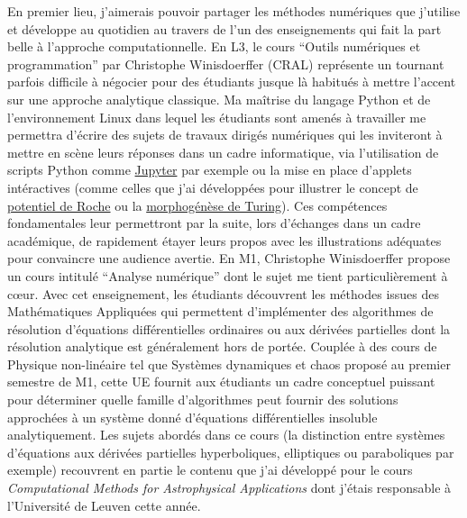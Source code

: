 \documentclass[11pt,onecolumn]{article}
\begin{document}
En premier lieu, j’aimerais pouvoir partager les méthodes numériques que j’utilise et développe au quotidien au travers de l’un des enseignements qui fait la part belle à l’approche computationnelle. En L3, le cours “Outils numériques et programmation” par Christophe Winisdoerffer (CRAL) représente un tournant parfois difficile à négocier pour des étudiants jusque là habitués à mettre l’accent sur une approche analytique classique. Ma maîtrise du langage Python et de l’environnement Linux dans lequel les étudiants sont amenés à travailler me permettra d’écrire des sujets de travaux dirigés numériques qui les inviteront à mettre en scène leurs réponses dans un cadre informatique, via l’utilisation de scripts Python comme \href{https://jupyter.org/}{Jupyter} par exemple ou la mise en place d’applets intéractives (comme celles que j’ai développées pour illustrer le concept de \href{http://demonstrations.wolfram.com/TrajectoryOfATestMassInARochePotential/}{potentiel de Roche} ou la \href{https://media4.obspm.fr/public/M2R/appliquettes/Turing/AutomateTuring_website.html}{morphogénèse de Turing}). 
Ces compétences fondamentales leur permettront par la suite, lors d’échanges dans un cadre académique, de rapidement étayer leurs propos avec les illustrations adéquates pour convaincre une audience avertie. En M1, Christophe Winisdoerffer propose un cours intitulé “Analyse numérique” dont le sujet me tient particulièrement à c\oe{}ur. Avec cet enseignement, les étudiants découvrent les méthodes issues des Mathématiques Appliquées qui permettent d’implémenter des algorithmes de résolution d’équations différentielles ordinaires ou aux dérivées partielles dont la résolution analytique est généralement hors de portée. Couplée à des cours de Physique non-linéaire tel que Systèmes dynamiques et chaos proposé au premier semestre de M1, cette UE fournit aux étudiants un cadre conceptuel puissant pour déterminer quelle famille d’algorithmes peut fournir des solutions approchées à un système donné d’équations différentielles insoluble analytiquement. Les sujets abordés dans ce cours (la distinction entre systèmes d’équations aux dérivées partielles hyperboliques, elliptiques ou paraboliques par exemple) recouvrent en partie le contenu que j’ai développé pour le cours \textit{Computational Methods for Astrophysical Applications} dont j’étais responsable à l’Université de Leuven cette année. 
\end{document}
